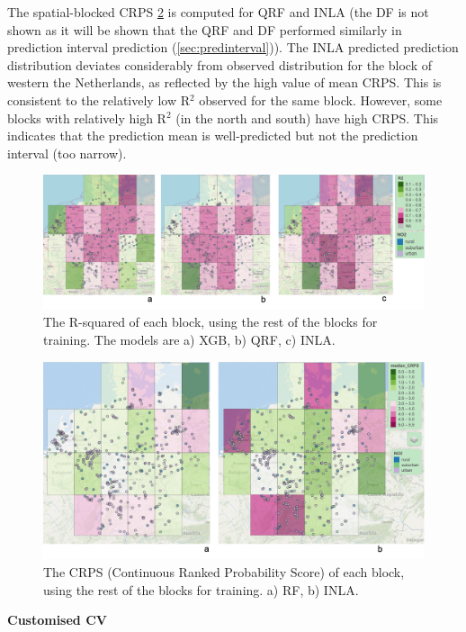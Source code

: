 \documentclass{article}
\begin{document}
The spatial-blocked CRPS \cref{fig:crps} is computed for QRF and INLA (the DF is not shown as it will be shown that the QRF and DF performed similarly in prediction interval prediction (\cref{sec:predinterval})). The INLA predicted prediction distribution deviates considerably from observed distribution for the block of western the Netherlands, as reflected by the high value of mean CRPS. This is consistent to the relatively low R$^2$ observed for the same block. However, some blocks with relatively high R$^2$ (in the north and south) have high CRPS. This indicates that the prediction mean is well-predicted but not the prediction interval (too narrow). 

\begin{figure}
    \centering
    \includegraphics[scale=0.4]{fig/r2spcv.png}
    \caption{The R-squared of each block, using the rest of the blocks for training. The models are a) XGB, b) QRF, c) INLA. 
}
    \label{fig:r2}
\end{figure}

\begin{figure}
    \centering
    \includegraphics[scale=0.3]{fig/crps_RF_INLA.png}
    \caption{The CRPS (Continuous Ranked Probability Score) of each block, using the rest of the blocks for training. a) RF, b) INLA. 
}
    \label{fig:crps}
\end{figure}

\vspace{0.5cm}
\noindent \textbf{Customised CV}
\end{document}
